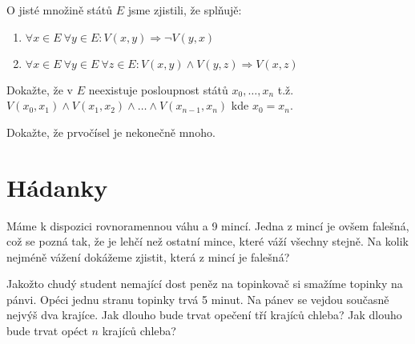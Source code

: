 \documentclass[10pt]{article}
\begin{document}
\begin{problem}
O jisté množině států $E$ jsme zjistili, že splňujě:
\begin{enumerate}
    \item $\forall x \in E \ \forall y \in E: V(x,y) \Rightarrow \neg V(y,x)$
    \item $\forall x \in E \ \forall y \in E \  \forall z \in E : V(x,y) \wedge V(y,z) \Rightarrow V(x,z)$
\end{enumerate} 
Dokažte, že v $E$ neexistuje posloupnost států $x_0, \ldots , x_n$ t.ž. $V(x_0,x_1) \wedge V(x_1,x_2) \wedge \ldots \wedge  V(x_{n-1},x_n)$ kde $x_0 = x_n$.
\end{problem}

\begin{problem}[Prvočísla]
Dokažte, že prvočísel je nekonečně mnoho.
\end{problem}

\section{Hádanky}

\begin{problem}
Máme k dispozici rovnoramennou váhu a 9 mincí. Jedna z mincí je ovšem falešná, což se pozná tak, že je lehčí než ostatní mince, které váží všechny stejně. Na kolik nejméně vážení dokážeme zjistit, která z mincí je falešná?
\end{problem}

\begin{problem}[Topinky]
Jakožto chudý student nemající dost peněz na topinkovač si smažíme topinky na pánvi. Opéci jednu stranu topinky trvá 5 minut. Na pánev se vejdou současně nejvýš dva krajíce. Jak dlouho bude trvat opečení tří krajíců chleba? Jak dlouho bude trvat opéct $n$ krajíců chleba?
\end{problem}
\end{document}
